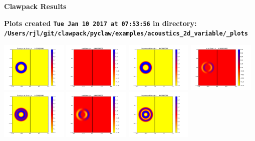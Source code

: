 \documentclass[11pt]{article}
\begin{document}
        \begin{center}{\Large\bf Clawpack Results}\vskip 5pt
        
        \bf Plots created {\tt Tue Jan 10 2017 at 07:53:56} in directory: \vskip 5pt
        \verb+/Users/rjl/git/clawpack/pyclaw/examples/acoustics_2d_variable/_plots+
        \end{center}
        \vskip 5pt
        \includegraphics[width=0.2375\textwidth]{frame0000fig0.png}
\includegraphics[width=0.2375\textwidth]{frame0000fig1.png}
\includegraphics[width=0.2375\textwidth]{frame0001fig0.png}
\includegraphics[width=0.2375\textwidth]{frame0001fig1.png}
\vskip 10pt 
\includegraphics[width=0.2375\textwidth]{frame0002fig0.png}
\includegraphics[width=0.2375\textwidth]{frame0002fig1.png}
\includegraphics[width=0.2375\textwidth]{frame0003fig0.png}
\end{document}
